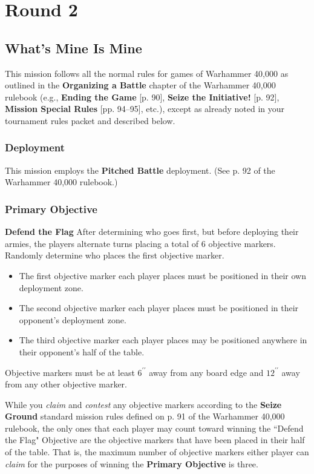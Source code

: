 \documentclass[12pt,titlepage]{article}
\newcommand{\inches}[1]{$#1^{\prime\prime}$}
\newcommand{\paragraphsmall}[1]{\noindent\textbf{#1}\quad}
\newcommand{\gameboilerplate}{This mission follows all the normal rules for games of Warhammer 40,000 as outlined in the \textbf{Organizing a Battle} chapter of the Warhammer 40,000 rulebook (e.g., \textbf{Ending the Game} [p. 90], \textbf{Seize the Initiative!} [p. 92], \textbf{Mission Special Rules} [pp. 94--95], etc.), except as already noted in your tournament rules packet and described below.}
\newcommand{\pitchedbattle}{This mission employs the \textbf{Pitched Battle} deployment. (See p. 92 of the Warhammer 40,000 rulebook.)}
\begin{document}
\newpage
{}
\section*{Round 2}
\vspace{-6pt}
\subsection*{What's Mine Is Mine}

{\footnotesize
\gameboilerplate

\vspace{-6pt}
\subsubsection*{Deployment}

\pitchedbattle

\vspace{-6pt}
\subsubsection*{Primary Objective}

\paragraphsmall{Defend the Flag} After determining who goes first, but before deploying their armies, the players alternate turns placing a total of 6 objective markers. Randomly determine who places the first objective marker.

\begin{itemize}
\item The first objective marker each player places must be positioned in their own deployment zone.
\item The second objective marker each player places must be positioned in their opponent's deployment zone.
\item The third objective marker each player places may be positioned anywhere in their opponent's half of the table.
\end{itemize}

Objective markers must be at least \inches{6} away from any board edge and \inches{12} away from any other objective marker.

While you \textit{claim} and \textit{contest} any objective markers according to the \textbf{Seize Ground} standard mission rules defined on p. 91 of the Warhammer 40,000 rulebook, the only ones that each player may count toward winning the ``Defend the Flag" Objective are the objective markers that have been placed in their half of the table. That is, the maximum number of objective markers either player can \textit{claim} for the purposes of winning the \textbf{Primary Objective} is three.

}
\end{document}
